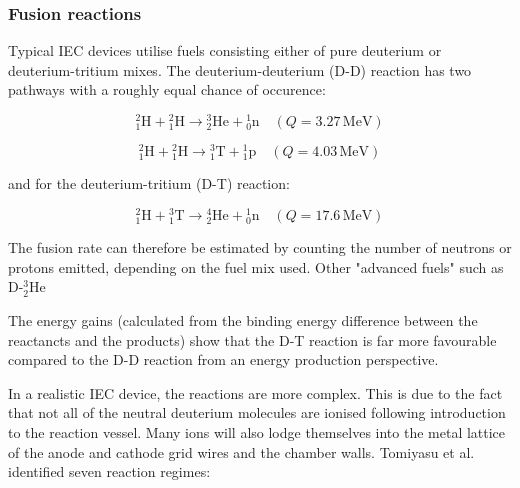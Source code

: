 \documentclass[a4paper,titlepage]{article}
\begin{document}
\begin{flushleft}
\subsubsection{Fusion reactions} 
\label{fusion_reactions}
Typical IEC devices utilise fuels consisting either of pure deuterium or deuterium-tritium mixes. The deuterium-deuterium (D-D) reaction has two pathways with a roughly equal chance of occurence:

\begin{equation*}
{}^{2}_{1}\mathrm{H} + {}^{2}_{1}\mathrm{H}
\rightarrow
{}^{3}_{2}\mathrm{He} + {}^{1}_{0}\mathrm{n}
\quad (Q = 3.27\,\text{MeV})
\end{equation*}

\begin{equation*}
{}^{2}_{1}\mathrm{H} + {}^{2}_{1}\mathrm{H}
\rightarrow
{}^{3}_{1}\mathrm{T} + {}^{1}_{1}\mathrm{p}
\quad (Q = 4.03\,\text{MeV})
\end{equation*}

and for the deuterium-tritium (D-T) reaction:

\begin{equation*}
{}^{2}_{1}\mathrm{H} + {}^{3}_{1}\mathrm{T}
\rightarrow
{}^{4}_{2}\mathrm{He} + {}^{1}_{0}\mathrm{n}
\quad (Q = 17.6\,\text{MeV})
\end{equation*}

The fusion rate can therefore be estimated by counting the number of neutrons or protons emitted, depending on the fuel mix used. Other "advanced fuels" such as D-${}^{3}_{2}\mathrm{He}$

The energy gains (calculated from the binding energy difference between the reactancts and the products) show that the D-T reaction is far more favourable compared to the D-D reaction from an energy production perspective. 

In a realistic IEC device, the reactions are more complex. This is due to the fact that not all of the neutral deuterium molecules are ionised following introduction to the reaction vessel. Many ions will also lodge themselves into the metal lattice of the anode and cathode grid wires and the chamber walls. Tomiyasu et al. identified seven reaction regimes:


\end{flushleft}
\end{document}

